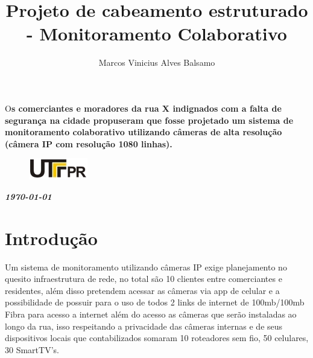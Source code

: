 \documentclass[	DIV=calc,%
							paper=a4,%
							fontsize=12pt,%
							onecolumn]{scrartcl}	 					%
\title{Projeto de cabeamento estruturado - Monitoramento Colaborativo}					%
\author{Marcos Vinicius Alves Balsamo}  	%
\date{}																				%
\newcommand{\initial}[1]{%
     \lettrine[lines=3,lhang=0.3,nindent=0em]{
     				\color{DarkGoldenrod}
     				{\textsf{#1}}}{}}
\begin{document}
\maketitle
\thispagestyle{fancy} 	
\thispagestyle{empty}		%




\initial{O}\textbf{s comerciantes e moradores da rua X indignados com a falta de segurança na cidade propuseram que fosse projetado um sistema de monitoramento colaborativo utilizando câmeras de alta resolução (câmera IP com resolução 1080 linhas).}

\begin{figure}
	\centering
	\includegraphics{utfpr}
\end{figure}

\vspace{3cm}
\centerline{\textit{\textbf{\today}}}

\clearpage
    \renewcommand*\listfigurename{Lista de figuras}
\listoffigures

\renewcommand*\listtablename{Lista de tabelas}
\listoftables




\clearpage
\renewcommand{\contentsname}{Sumário}
\tableofcontents
\clearpage

\section{Introdução}
Um sistema de monitoramento utilizando câmeras IP exige planejamento no quesito infraestrutura de rede, no total são 10 clientes entre comerciantes e residentes, além disso pretendem acessar as câmeras via app de celular e a possibilidade de possuir para o uso de todos 2 links de internet de  100mb/100mb Fibra para acesso a internet além do acesso as câmeras que serão instaladas ao longo da rua, isso respeitando a privacidade das câmeras internas e de seus dispositivos locais que contabilizados somaram 10 roteadores sem fio, 50 celulares, 30 SmartTV's.
\end{document}
